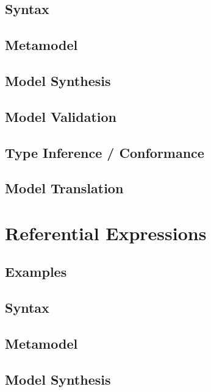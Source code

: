\documentclass[a4paper,oneside,12pt, extrafontsizes]{memoir}
\begin{document}
    \section{Syntax}
    

    \section{Metamodel}

    \section{Model Synthesis}

    \section{Model Validation}
    

    \section{Type Inference / Conformance}

    \section{Model Translation}

  \chapter{Referential Expressions}
  \label{ch:referential}
  

    \section{Examples}
    

    \section{Syntax}
    

    \section{Metamodel}

    \section{Model Synthesis}
\end{document}

